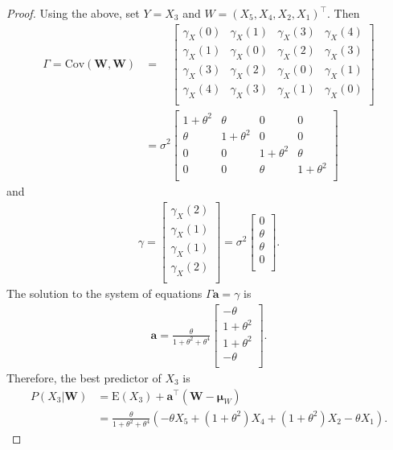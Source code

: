 \documentclass[12pt]{article}
\theoremstyle{definition}
\newcommand{\E}{\text{E}}
\newcommand{\Co}[2]{\text{Cov}\left({#1}, {#2}\right)}
\newcommand{\vect}[1]{\boldsymbol{#1}}
\begin{document}
\begin{proof}
  Using the above, set $Y = X_3$ and $W = (X_5, X_4, X_2, X_1)^\intercal$. Then
  \begin{align*}
    \Gamma = \Co{\vect{W}}{\vect{W}} &=
    \phantom{\sigma^2}
    \begin{bmatrix}
      \gamma_X(0) & \gamma_X(1) & \gamma_X(3) & \gamma_X(4) \\
      \gamma_X(1) & \gamma_X(0) & \gamma_X(2) & \gamma_X(3) \\
      \gamma_X(3) & \gamma_X(2) & \gamma_X(0) & \gamma_X(1) \\
      \gamma_X(4) & \gamma_X(3) & \gamma_X(1) & \gamma_X(0) \\
    \end{bmatrix}\\
    &=
    \sigma^2
    \begin{bmatrix}
      1 + \theta^2 & \theta & 0 & 0 \\
      \theta & 1 + \theta^2 & 0 & 0 \\
      0 & 0 & 1 + \theta^2 & \theta \\
      0 & 0 & \theta & 1 + \theta^2 \\
    \end{bmatrix}
  \end{align*}
  and
  \begin{align*}
    \gamma =
    \begin{bmatrix}
      \gamma_X(2) \\
      \gamma_X(1) \\
      \gamma_X(1) \\
      \gamma_X(2) \\
    \end{bmatrix}
    = \sigma^2
    \begin{bmatrix}
      0 \\
      \theta \\
      \theta \\
      0 \\
    \end{bmatrix}.
  \end{align*}
  The solution to the system of equations $\Gamma \vect{a} = \gamma$ is
  \begin{align*}
    \vect{a} = \frac{\theta}{1 + \theta^2 + \theta^4}
    \begin{bmatrix}
      -\theta \\
      1 + \theta^2 \\
      1 + \theta^2 \\
      -\theta \\
    \end{bmatrix}.
  \end{align*}
  Therefore, the best predictor of $X_3$ is
  \begin{align*}
    P(X_3|\vect{W}) &= \E(X_3) + \vect{a}^\intercal (\vect{W} - \vect{\mu}_W) \\
    &= \frac{\theta}{1 + \theta^2 + \theta^4} (- \theta  X_5 + (1 + \theta^2) X_4 + (1 + \theta^2) X_2 -\theta X_1).
  \end{align*}
\end{proof}
\end{document}
